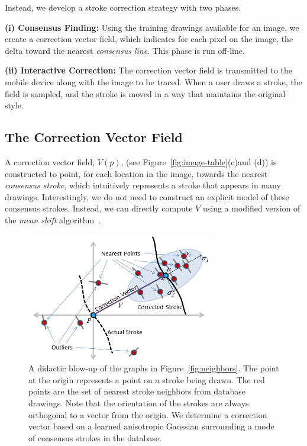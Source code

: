 Instead, we develop a stroke correction strategy with two phases.

\textbf{(i) Consensus Finding:} Using the training drawings available for an image, we create a correction vector field, which indicates for each pixel on the image, the delta toward the nearest {\em consensus line}.  This phase is run off-line.

\textbf{(ii) Interactive Correction:} The correction vector field is transmitted to the mobile device along with the image to be traced.  When a user draws a stroke, the field is sampled, and the stroke is moved in a way that maintains the original style.

\subsection{The Correction Vector Field}


A correction vector field, $V(p)$, (see Figure~\ref{fig:image-table}(c)and (d)) is constructed to point, for each location in the image, towards the nearest {\em consensus stroke}, which intuitively represents a stroke that appears in many drawings. Interestingly, we do not need to construct an explicit model of these consensus strokes. Instead, we can directly compute $V$ using a modified version of the {\em mean shift} algorithm~\cite{10.1109/ICCV.1999.790416}.


\begin{figure}
  \centering%
  \includegraphics[width=3.2in]{ellipse.png}
  \caption{A didactic blow-up of the graphs in Figure~\ref{fig:neighbors}. The point at the origin represents a point on a stroke being drawn. The red points are the set of nearest stroke neighbors from database drawings. Note that the orientation of the strokes are always orthogonal to a vector from the origin. We determine a correction vector based on a learned anisotropic Gaussian surrounding a mode of consensus strokes in the database.}
  \label{fig:ellipse}
\end{figure}

